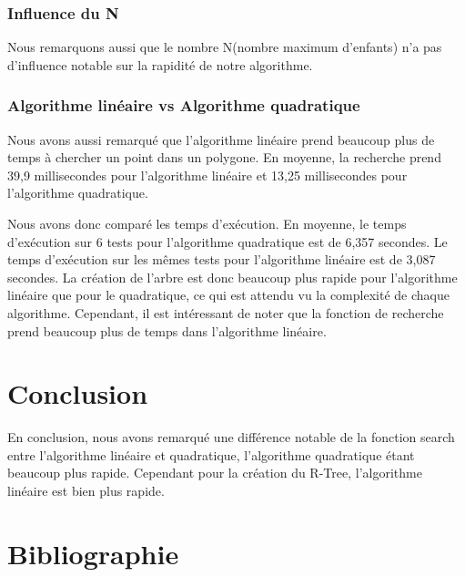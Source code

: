 \documentclass[utf8]{article}
\begin{document}
\begin{large}
  \subsubsection{Influence du N}
  \par
  \indent
  Nous remarquons aussi que le nombre N(nombre maximum d'enfants) n'a pas
  d'influence notable sur la rapidité de notre algorithme.
  \par
  \subsubsection{Algorithme linéaire vs Algorithme quadratique}
  \par
  \indent
  Nous avons aussi remarqué que l'algorithme linéaire prend beaucoup plus de temps
  à chercher un point dans un polygone. En moyenne, la recherche prend 39,9
  millisecondes pour l'algorithme linéaire et 13,25 millisecondes pour
  l'algorithme quadratique.
  \par
  \indent
  \par
  Nous avons donc comparé les temps d'exécution. En moyenne, le temps
  d'exécution sur 6 tests pour l'algorithme quadratique est de 6,357 secondes.
  Le temps d'exécution sur les mêmes tests pour l'algorithme linéaire est de
  3,087 secondes. La création de l'arbre est donc beaucoup plus rapide pour
  l'algorithme linéaire que pour le quadratique, ce qui est attendu vu la
  complexité de chaque algorithme. Cependant, il est intéressant de noter que la
  fonction de recherche prend beaucoup plus de temps dans l'algorithme linéaire.
  \par

  \section{Conclusion}
  \par
  \indent
  En conclusion, nous avons remarqué une différence notable de la fonction
  search entre l'algorithme linéaire et quadratique, l'algorithme quadratique
  étant beaucoup plus rapide. Cependant pour la création du R-Tree, l'algorithme
  linéaire est bien plus rapide.
  \par

  \section{Bibliographie}


\end{large}
\end{document}
